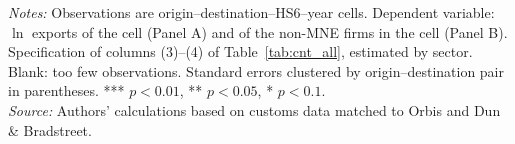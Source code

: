 \documentclass[11pt,a4paper]{article}
\begin{document}
\begin{table}[H]\centering\small%
  \caption{Multinational Presence and Exports by Sector: Intensive Margin}%
  \label{tab:f5sum}%
  \par\vspace{3pt}%
  \begin{minipage}{0.95\textwidth}\footnotesize %
  \textit{Notes:} Observations are origin--destination--HS6--year cells. Dependent variable: $\ln$ exports of the cell (Panel A) and of the non-MNE firms in the cell (Panel B). Specification of columns (3)--(4) of Table~\ref{tab:cnt_all}, estimated by sector. Blank: too few observations. Standard errors clustered by origin--destination pair in parentheses. *** $p<0.01$, ** $p<0.05$, * $p<0.1$.\\[3pt]%
  \textit{Source:} Authors' calculations based on customs data matched to Orbis and Dun \& Bradstreet.%
  \end{minipage}%
  \end{table}
\end{document}
